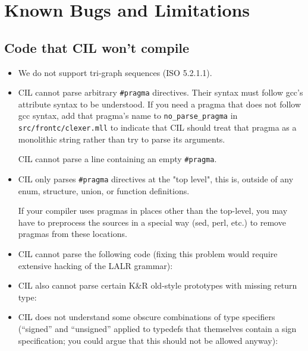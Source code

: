 \documentclass[letterpaper]{article}
\def\t#1{{\tt #1}}
\begin{document}
\section{Known Bugs and Limitations}

\subsection{Code that CIL won't compile}
\begin{itemize}
\item We do not support tri-graph sequences (ISO 5.2.1.1).

\item CIL cannot parse arbitrary \t{\#pragma} directives.  Their
  syntax must follow gcc's attribute syntax to be understood.  If you
  need a pragma that does not follow gcc syntax, add that pragma's name
  to \t{no\_parse\_pragma} in \t{src/frontc/clexer.mll} to indicate that
  CIL should treat that pragma as a monolithic string rather than try
  to parse its arguments.

  CIL cannot parse a line containing an empty \t{\#pragma}.

\item CIL only parses \t{\#pragma} directives at the "top level", this is,
  outside of any enum, structure, union, or function definitions.

  If your compiler uses pragmas in places other than the top-level,
  you may have to preprocess the sources in a special way (sed, perl,
  etc.) to remove pragmas from these locations.

\item CIL cannot parse the following code (fixing this problem would require
  extensive hacking of the LALR grammar):

\item CIL also cannot parse certain K\&R old-style prototypes with missing
  return type:

\item CIL does not understand some obscure combinations of type
  specifiers (``signed'' and ``unsigned'' applied to typedefs that
  themselves contain a sign specification; you could argue that this
  should not be allowed anyway):


\end{itemize}
\end{document}
